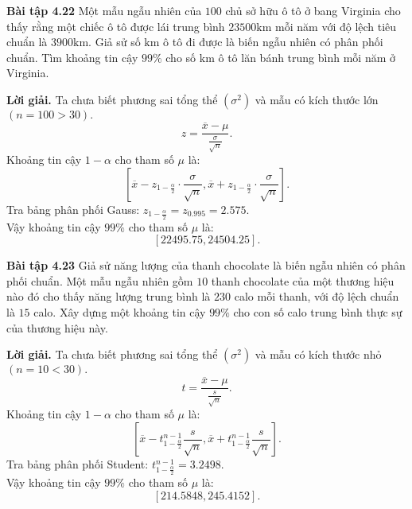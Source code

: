 \documentclass[12pt,a4paper]{article}
\begin{document}
\begin{mybox}
\textbf{Bài tập 4.22} Một mẫu ngẫu nhiên của $100$ chủ sở hữu ô tô ở bang Virginia cho thấy rằng một chiếc ô tô được lái trung bình $23500 \mathrm{km}$ mỗi năm với độ lệch tiêu chuẩn là $3900 \mathrm{km}.$ Giả sử số $\mathrm{km}$ ô tô đi được là biến ngẫu nhiên có phân phối chuẩn. Tìm khoảng tin cậy $99\%$ cho số $\mathrm{km}$ ô tô lăn bánh trung bình mỗi năm ở Virginia.
\end{mybox}
\textbf{Lời giải.} Ta chưa biết phương sai tổng thể $\left( {\sigma^2} \right)$ và mẫu có kích thước lớn $\left( {n = 100 > 30} \right).$
$$z = \frac{\overline{x} - \mu}{\frac{\sigma}{\sqrt{n}}}.$$
Khoảng tin cậy $1 - \alpha$ cho tham số $\mu$ là:
$$\left[ {\overline{x} - z_{1 - \frac{\alpha}{2}} \cdot \frac{\sigma}{\sqrt{n}}, {\overline{x} + z_{1 - \frac{\alpha}{2}} \cdot \frac{\sigma}{\sqrt{n}}}} \right].$$
Tra bảng phân phối Gauss: $z_{1 - \frac{\alpha}{2}} = z_{0.995} = 2.575.$\\
Vậy khoảng tin cậy $99\%$ cho tham số $\mu$ là:
$$\left[ {22495.75, 24504.25} \right].$$

\begin{mybox}
\textbf{Bài tập 4.23}  Giả sử năng lượng của thanh chocolate là biến ngẫu nhiên có phân phối chuẩn. Một mẫu ngẫu nhiên gồm $10$ thanh chocolate của một thương hiệu nào đó cho thấy năng lượng trung bình là $230$ calo mỗi thanh, với độ lệch chuẩn là $15$ calo. Xây dựng một khoảng tin cậy $99\%$ cho con số calo trung bình thực sự của thương hiệu này.
\end{mybox}
\textbf{Lời giải.} Ta chưa biết phương sai tổng thể $\left( {\sigma^2} \right)$ và mẫu có kích thước nhỏ $\left( {n = 10 < 30} \right).$
$$t = \frac{\overline{x} - \mu}{\frac{s}{\sqrt{n}}}.$$
Khoảng tin cậy $1 - \alpha$ cho tham số $\mu$ là:
$$\left[ {\overline x  - t_{1 - \frac{\alpha }{2}}^{n - 1}\frac{s}{{\sqrt n }},\overline x  + t_{1 - \frac{\alpha }{2}}^{n - 1}\frac{s}{{\sqrt n }}} \right].$$
Tra bảng phân phối Student: $t_{1 - \frac{\alpha }{2}}^{n - 1} = 3.2498.$\\
Vậy khoảng tin cậy $99\%$ cho tham số $\mu$ là:
$$\left[ {214.5848, 245.4152} \right].$$
\end{document}
